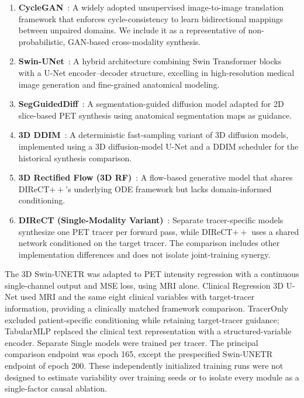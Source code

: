 \documentclass{article}
\begin{document}
\begin{enumerate}
    \item \textbf{CycleGAN}~\cite{zhu2017unpaired}: A widely adopted unsupervised image-to-image translation framework that enforces cycle-consistency to learn bidirectional mappings between unpaired domains. We include it as a representative of non-probabilistic, GAN-based cross-modality synthesis.

    \item \textbf{Swin-UNet}~\cite{Cao2021swin}: A hybrid architecture combining Swin Transformer blocks with a U-Net encoder–decoder structure, excelling in high-resolution medical image generation and fine-grained anatomical modeling.

    \item \textbf{SegGuidedDiff}~\cite{konz2024anatomically}: A segmentation-guided diffusion model adapted for 2D slice-based PET synthesis using anatomical segmentation maps as guidance.

    \item \textbf{3D DDIM}~\cite{song2021ddim,pinaya2023generative}: A deterministic fast-sampling variant of 3D diffusion models, implemented using a 3D diffusion-model U-Net and a DDIM scheduler for the historical synthesis comparison.

    \item \textbf{3D Rectified Flow (3D RF)}~\cite{Xing2022}: A flow-based generative model that shares DIReCT$++$’s underlying ODE framework but lacks domain-informed conditioning.

    \item \textbf{DIReCT (Single-Modality Variant)}~\cite{liu2025direct}: Separate tracer-specific models synthesize one PET tracer per forward pass, while DIReCT$++$ uses a shared network conditioned on the target tracer. The comparison includes other implementation differences and does not isolate joint-training synergy.
\end{enumerate}

The 3D Swin-UNETR was adapted to PET intensity regression with a continuous single-channel output and MSE loss, using MRI alone. Clinical Regression 3D U-Net used MRI and the same eight clinical variables with target-tracer information, providing a clinically matched framework comparison. TracerOnly excluded patient-specific conditioning while retaining target-tracer guidance; TabularMLP replaced the clinical text representation with a structured-variable encoder. Separate Single models were trained per tracer. The principal comparison endpoint was epoch 165, except the prespecified Swin-UNETR endpoint of epoch 200. These independently initialized training runs were not designed to estimate variability over training seeds or to isolate every module as a single-factor causal ablation.
\end{document}
